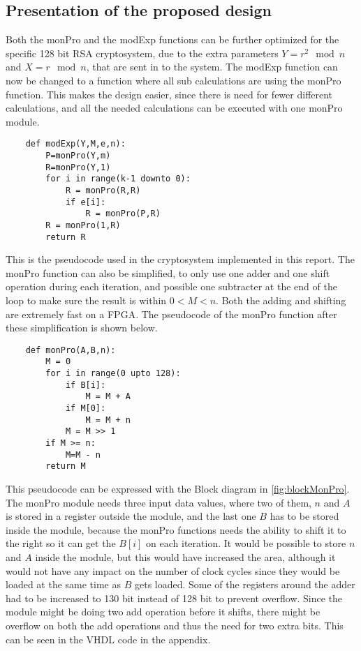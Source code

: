 \subsection{Presentation of the proposed design}\label{sec:design}
Both the monPro and the modExp functions can be further optimized for the specific 128 bit RSA cryptosystem, due to the extra parameters $Y=r^2 \mod{n}$ and $X=r\mod{n}$, that are sent in to the system. The modExp function can now be changed to a function where all sub calculations are using the monPro function. This makes the design easier, since there is need for fewer different calculations, and all the needed calculations can be executed with one monPro module.
%
\begin{lstlisting}
    def modExp(Y,M,e,n):
        P=monPro(Y,m)
        R=monPro(Y,1)
        for i in range(k-1 downto 0):
            R = monPro(R,R)
            if e[i]:
                R = monPro(P,R)
        R = monPro(1,R)
        return R
\end{lstlisting}
%
This is the pseudocode used in the cryptosystem implemented in this report. The monPro function can also be simplified, to only use one adder and one shift operation during each iteration, and possible one subtracter at the end of the loop to make sure the result is within $0<M<n$. Both the adding and shifting are extremely fast on a FPGA. The pseudocode of the monPro function after these simplification is shown below.
%
\begin{lstlisting}
    def monPro(A,B,n):
        M = 0 
        for i in range(0 upto 128):
            if B[i]:
                M = M + A 
            if M[0]:
                M = M + n 
            M = M >> 1
        if M >= n:
            M=M - n
        return M
\end{lstlisting}
%
This pseudocode can be expressed with the Block diagram in \cref{fig:blockMonPro}. The monPro module needs three input data values, where two of them, $n$ and $A$ is stored in a register outside the module, and the last one $B$ has to be stored inside the module, because the monPro functions needs the ability to shift it to the right so it can get the $B[i]$ on each iteration. It would be possible to store $n$ and $A$ inside the module, but this would have increased the area, although it would not have any impact on the number of clock cycles since they would be loaded at the same time as $B$ gets loaded. Some of the registers around the adder had to be increased to 130 bit instead of 128 bit to prevent overflow. Since the module might be doing two add operation before it shifts, there might be overflow on both the add operations and thus the need for two extra bits. This can be seen in the VHDL code in the appendix.

